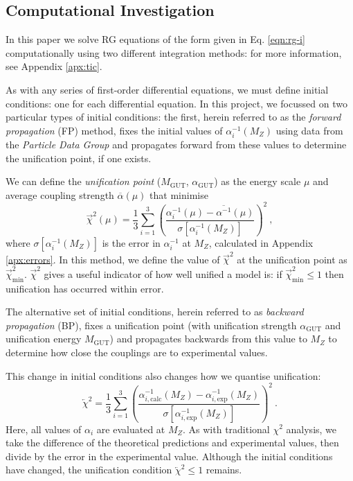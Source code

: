 \documentclass[12pt,a4paper,oneside]{article}
\begin{document}
\subsection{Computational Investigation}
\label{sec:comp}

In this paper we solve RG equations of the form given in Eq. \ref{eqn:rg-i} computationally using two different integration methods: for more information, see Appendix \ref{apx:tic}. 

As with any series of first-order differential equations, we must define initial conditions: one for each differential equation. In this project, we focussed on two particular types of initial conditions: the first, herein referred to as the \textit{forward propagation} (FP) method, fixes the initial values of $\alpha_i^{-1}(M_Z)$ using data from the \textit{Particle Data Group} \cite{pdg} and propagates forward from these values to determine the unification point, if one exists. 

We can define the \textit{unification point} ($M_\mathrm{GUT}$, $\alpha_\mathrm{GUT}$) as the energy scale $\mu$ and average coupling strength $\overline{\alpha}(\mu)$ that minimise
\begin{equation}
\overrightarrow{\chi}^2 (\mu) = \frac{1}{3} \sum_{i = 1}^{3} \left(\dfrac{\alpha_i^{-1}(\mu) - \overline{\alpha^{-1}}(\mu)}{\sigma[\alpha_i^{-1}(M_Z)]}\right)^2 \:,
\label{eqn:fp}
\end{equation}
where $\sigma[\alpha_i^{-1}(M_Z)]$ is the error in $\alpha_i^{-1}$ at $M_Z$, calculated in Appendix \ref{apx:errors}. In this method, we define the value of $\overrightarrow{\chi}^2$ at the unification point as $\overrightarrow{\chi}^2_\mathrm{min}$. $\overrightarrow{\chi}^2$ gives a useful indicator of how well unified a model is: if $\overrightarrow{\chi}_\mathrm{min}^2 \leq 1$ then unification has occurred within error.

The alternative set of initial conditions, herein referred to as \textit{backward propagation} (BP), fixes a unification point (with unification strength $\alpha_\mathrm{GUT}$ and unification energy $M_\mathrm{GUT}$) and propagates backwards from this value to $M_Z$ to determine how close the couplings are to experimental values. 

This change in initial conditions also changes how we quantise unification:
\begin{equation}
\overleftarrow{\chi}^2 = \frac{1}{3} \sum_{i = 1}^{3} \left(\dfrac{\alpha_{i,\mathrm{calc}}^{-1}(M_Z) - \alpha_{i,\mathrm{exp}}^{-1}(M_Z)}{\sigma[\alpha_{i,\mathrm{exp}}^{-1}(M_Z)]}\right)^2 \:.
\label{eqn:bp}
\end{equation}
Here, all values of $\alpha_i$ are evaluated at $M_Z$. As with traditional $\chi^2$ analysis, we take the difference of the theoretical predictions and experimental values, then divide by the error in the experimental value. Although the initial conditions have changed, the unification condition $\overleftarrow{\chi}^2 \leq 1$ remains. 
\end{document}
